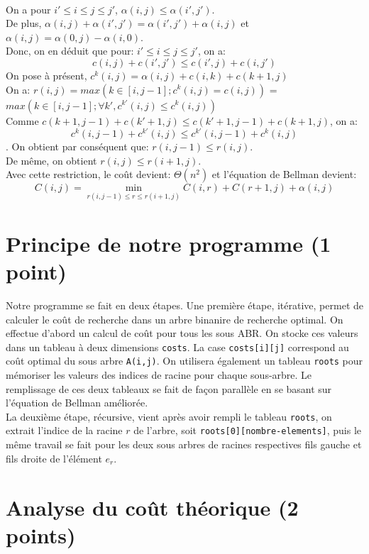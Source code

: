 \documentclass[a4paper, 10pt, french]{article}
\begin{document}
\\
On a pour $i' \leq i \leq j \leq j'$, $\alpha(i,j) \leq \alpha(i',j')$.\\
De plus, $\alpha(i,j) + \alpha(i',j') = \alpha(i',j') + \alpha(i,j)$ et $\alpha(i,j) = \alpha(0,j)- \alpha(i,0)$.\\
Donc, on en déduit que pour: $i' \leq i \leq j \leq j'$, on a:$$ c(i,j) + c(i',j') \leq c(i',j)+c(i,j')$$
On pose à présent, $c^{k}(i,j) = \alpha(i,j)+c(i,k)+c(k+1,j)$ \\
On a: $r(i,j) = max(k \in [i,j-1] ; c^k(i,j) = c(i,j))$ = $max(k \in [i,j-1] ; \forall k', c^{k'}(i,j) \leq c^k(i,j))$\\
Comme $c(k+1, j-1) + c(k'+1,j) \leq c(k'+1, j-1) + c(k+1,j)$, on a: $$ c^k(i,j-1) + c^{k'}(i,j) \leq c^{k'}(i,j-1) + c^k(i,j) $$.
On obtient par conséquent que: $r(i,j-1) \leq r(i,j)$. \\
De même, on obtient $r(i,j) \leq r(i+1,j)$.\\
Avec cette restriction, le coût devient: $\Theta(n^2)$ et l'équation de Bellman devient:
$$
C(i,j) = \underset{r(i,j-1)\leq r \leq r(i+1,j)}{\min} C(i,r) + C(r+1,j) + \alpha(i,j)
$$
\section{Principe de notre  programme (1 point)}
{Notre programme se fait en deux étapes. Une première étape, itérative, permet de calculer le coût de recherche dans un arbre binanire de recherche
optimal. On effectue d'abord un calcul de coût pour tous les sous ABR. On stocke ces valeurs dans un tableau à deux dimensions \texttt{costs}.
La case \texttt{costs[i][j]} correspond au coût optimal du sous arbre \texttt{A(i,j)}. On utilisera également un tableau \texttt{roots}
pour mémoriser les valeurs des indices de racine pour chaque sous-arbre. Le remplissage de ces deux tableaux se fait de façon parallèle en se
basant sur l'équation de Bellman améliorée.
\\La deuxième étape, récursive, vient après avoir rempli le tableau \texttt{roots}, on extrait l'indice de la racine $r$ de l'arbre, soit \texttt{roots[0][nombre-elements]}, puis le même travail
se fait pour les deux sous arbres de racines respectives fils gauche et fils droite de l'élément $e_r$.
} 

\section{Analyse du coût théorique (2 points)}
\end{document}
